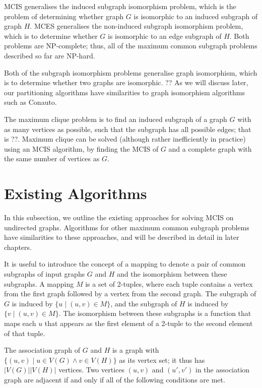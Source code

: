 MCIS generalises the induced subgraph isomorphism problem, which is the problem
of determining whether graph $G$ is isomorphic to an induced subgraph of graph $H$.
MCES generalises the non-induced subgraph isomorphism problem, which is to
determine whether $G$ is isomorphic to an edge subgraph of $H$. Both problems are
NP-complete; thus, all of the maximum common subgraph problems described so far
are NP-hard.

Both of the subgraph isomorphism problems generalise graph isomorphism, which
is to determine whether two graphs are isomorphic. ?? As we will discuss later,
our partitioning algorithms have similarities to graph isomorphism algorithms
such as Conauto.

The maximum clique problem is to find an induced subgraph of a graph $G$ with as
many vertices as possible, such that the subgraph has all possible edges; that
is ??. Maximum clique can be solved (although rather inefficiently in practice)
using an MCIS algorithm, by finding the MCIS of $G$ and a complete graph with the
same number of vertices as $G$.

\section{Existing Algorithms}

In this subsection, we outline the existing approaches for solving MCIS on
undirected graphs. Algorithms for other maximum common subgraph problems have
similarities to these approaches, and will be described in detail in later
chapters.

It is useful to introduce the concept of a mapping to denote a pair of common
subgraphs of input graphs $G$ and $H$ and the isomorphism between these subgraphs.
A mapping $M$ is a set of 2-tuples, where each tuple contains a vertex from the
first graph followed by a vertex from the second graph. The subgraph of $G$ is
induced by $\{u \mid (u, v) \in M\}$, and the subgraph of $H$ is induced by $\{v \mid (u, v)
\in M\}$. The isomorphism between these subgraphs is a function that maps each $u$
that appears as the first element of a 2-tuple to the second element of that
tuple.

The association graph of $G$ and $H$ is a graph with $\{(u,v) \mid u \in V(G) \wedge v \in
V(H)\}$ as its vertex set; it thus has $|V(G)||V(H)|$ vertices. Two vertices $(u,v)$
and $(u',v')$ in the association graph are adjacent if and only if all of the
following conditions are met.

